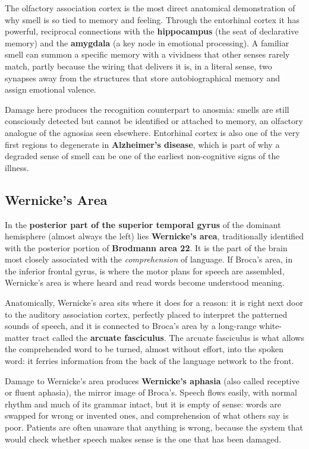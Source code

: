 \documentclass[11pt]{article}
\begin{document}
The olfactory association cortex is the most direct anatomical demonstration of why smell is so tied to memory and feeling. Through the entorhinal cortex it has powerful, reciprocal connections with the \textbf{hippocampus} (the seat of declarative memory) and the \textbf{amygdala} (a key node in emotional processing). A familiar smell can summon a specific memory with a vividness that other senses rarely match, partly because the wiring that delivers it is, in a literal sense, two synapses away from the structures that store autobiographical memory and assign emotional valence.

Damage here produces the recognition counterpart to anosmia: smells are still consciously detected but cannot be identified or attached to memory, an olfactory analogue of the agnosias seen elsewhere. Entorhinal cortex is also one of the very first regions to degenerate in \textbf{Alzheimer's disease}, which is part of why a degraded sense of smell can be one of the earliest non-cognitive signs of the illness.

\subsection{Wernicke's Area}

In the \textbf{posterior part of the superior temporal gyrus} of the dominant hemisphere (almost always the left) lies \textbf{Wernicke's area}, traditionally identified with the posterior portion of \textbf{Brodmann area 22}. It is the part of the brain most closely associated with the \textit{comprehension} of language. If Broca's area, in the inferior frontal gyrus, is where the motor plans for speech are assembled, Wernicke's area is where heard and read words become understood meaning.

Anatomically, Wernicke's area sits where it does for a reason: it is right next door to the auditory association cortex, perfectly placed to interpret the patterned sounds of speech, and it is connected to Broca's area by a long-range white-matter tract called the \textbf{arcuate fasciculus}. The arcuate fasciculus is what allows the comprehended word to be turned, almost without effort, into the spoken word: it ferries information from the back of the language network to the front.

Damage to Wernicke's area produces \textbf{Wernicke's aphasia} (also called receptive or fluent aphasia), the mirror image of Broca's. Speech flows easily, with normal rhythm and much of its grammar intact, but it is empty of sense: words are swapped for wrong or invented ones, and comprehension of what others say is poor. Patients are often unaware that anything is wrong, because the system that would check whether speech makes sense is the one that has been damaged.
\end{document}
